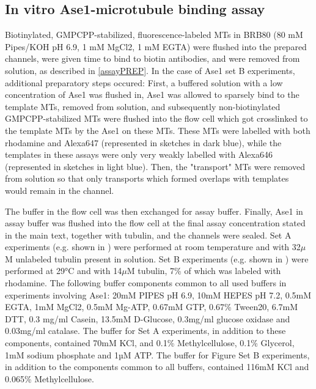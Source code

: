 \subsection{In vitro Ase1-microtubule binding assay}
Biotinylated, GMPCPP-stabilized, fluorescence-labeled MTs in BRB80 (80 mM Pipes/KOH pH 6.9, 1 mM MgCl2, 1 mM EGTA) were flushed into the prepared channels, were given time to bind to biotin antibodies, and were removed from solution, as described in \autoref{assayPREP}. In the case of Ase1 set B experiments, additional preparatory steps occured: First, a buffered solution with a low concentration of Ase1 was flushed in, Ase1 was allowed to sparsely bind to the template MTs, removed from solution, and subsequently non-biotinylated GMPCPP-stabilized MTs were flushed into the flow cell which got crosslinked to the template MTs by the Ase1 on these MTs. These MTs were labelled with both rhodamine and Alexa647 (represented in sketches in dark blue), while the templates in these assays were only very weakly labelled with Alexa646 (represented in sketches in light blue). Then, the "transport" MTs were removed from solution so that only transports which formed overlaps with templates would remain in the channel. \par 
The buffer in the flow cell was then exchanged for assay buffer. Finally, Ase1 in assay buffer was flushed into the flow cell at the final assay concentration stated in the main text, together with tubulin, and the channels were sealed. Set A experiments (e.g. shown in ) were performed at room temperature and with 32$\mu$M unlabeled tubulin present in solution. Set B experiments (e.g. shown in ) were performed at 29°C and with 14$\mu$M tubulin, 7\% of which was labeled with rhodamine. The following buffer components common to all used buffers in experiments involving Ase1: 20mM PIPES pH 6.9, 10mM HEPES pH 7.2, 0.5mM EGTA, 1mM MgCl2, 0.5mM Mg-ATP, 0.67mM GTP, 0.67\% Tween20, 6.7mM DTT, 0.3 mg/ml Casein, 13.5mM D-Glucose, 0.3mg/ml glucose oxidase and 0.03mg/ml catalase. The buffer for Set A experiments, in addition to these components, contained 70mM KCl, and 0.1\% Methylcellulose, 0.1\% Glycerol, 1mM sodium phosphate and 1µM ATP. The buffer for Figure Set B experiments, in addition to the components common to all buffers, contained 116mM KCl and 0.065\% Methylcellulose.

